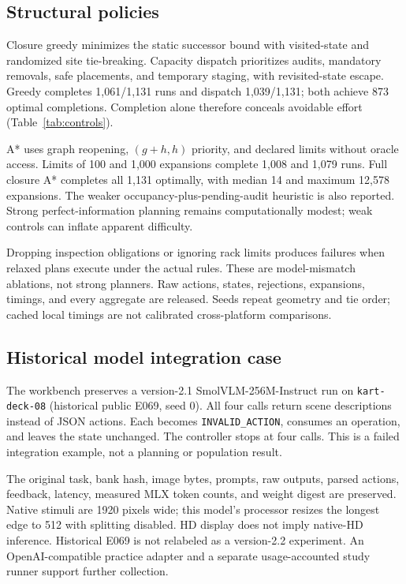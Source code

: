 \documentclass[10pt,twocolumn,letterpaper]{article}
\begin{document}
\subsection{Structural policies}
Closure greedy minimizes the static successor bound with visited-state
and randomized site tie-breaking. Capacity dispatch prioritizes audits,
mandatory removals, safe placements, and temporary staging, with
revisited-state escape. Greedy completes 1,061/1,131 runs and dispatch
1,039/1,131; both achieve 873 optimal completions. Completion alone
therefore conceals avoidable effort (Table~\ref{tab:controls}).

A* uses graph reopening, $(g+h,h)$ priority, and declared limits without
oracle access. Limits of 100 and 1,000 expansions complete 1,008 and
1,079 runs. Full closure A* completes all 1,131 optimally, with median
14 and maximum 12,578 expansions. The weaker occupancy-plus-pending-audit
heuristic is also reported. Strong perfect-information planning remains
computationally modest; weak controls can inflate apparent difficulty.

Dropping inspection obligations or ignoring rack limits produces
failures when relaxed plans execute under the actual rules. These are
model-mismatch ablations, not strong planners. Raw actions, states,
rejections, expansions, timings, and every aggregate are released.
Seeds repeat geometry and tie order; cached local timings are not
calibrated cross-platform comparisons.

\subsection{Historical model integration case}
The workbench preserves a version-2.1 SmolVLM-256M-Instruct run on
\texttt{kart-deck-08} (historical public E069, seed 0). All four calls
return scene descriptions instead of JSON actions. Each becomes
\texttt{INVALID\_ACTION}, consumes an operation, and leaves the state
unchanged. The controller stops at four calls. This is a failed
integration example, not a planning or population result.

The original task, bank hash, image bytes, prompts, raw outputs, parsed
actions, feedback, latency, measured MLX token counts, and weight digest
are preserved. Native stimuli are 1920 pixels wide; this model's processor
resizes the longest edge to 512 with splitting disabled. HD display does
not imply native-HD inference. Historical E069 is not relabeled as a
version-2.2 experiment. An OpenAI-compatible practice adapter and a
separate usage-accounted study runner support further collection.
\end{document}
